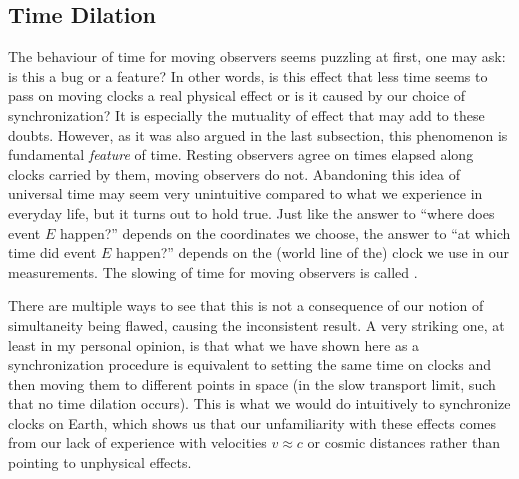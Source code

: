 


		\subsection{Time Dilation}
The behaviour of time for moving observers seems puzzling at first, one may ask: is this a bug or a feature? In other words, is this effect that less time seems to pass on moving clocks a real physical effect or is it caused by our choice of synchronization? It is especially the mutuality of effect that may add to these doubts. However, as it was also argued in the last subsection, this phenomenon is fundamental \emph{feature} of time. Resting observers agree on times elapsed along clocks carried by them, moving observers do not. Abandoning this idea of universal time may seem very unintuitive compared to what we experience in everyday life, but it turns out to hold true. Just like the answer to \enquote{where does event $E$ happen?} depends on the coordinates we choose, the answer to \enquote{at which time did event $E$ happen?} depends on the (world line of the) clock we use in our measurements. The slowing of time for moving observers is called .


There are multiple ways to see that this is not a consequence of our notion of simultaneity being flawed, causing the inconsistent result. A very striking one, at least in my personal opinion, is that what we have shown here as a synchronization procedure is equivalent to setting the same time on clocks and then moving them to different points in space (in the slow transport limit, such that no time dilation occurs). This is what we would do intuitively to synchronize clocks on Earth, which shows us that our unfamiliarity with these effects comes from our lack of experience with velocities $v \approx c$ or cosmic distances rather than pointing to unphysical effects.\\


